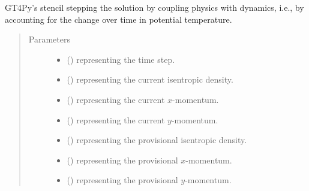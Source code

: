 \documentclass[letterpaper,10pt,english]{sphinxmanual}
\begin{document}
\begin{fulllineitems}
\begin{fulllineitems}
\label{\detokenize{api:dycore.prognostic_isentropic_centered.PrognosticIsentropicCentered._stencil_stepping_by_coupling_physics_with_dynamics_defs}}
GT4Py’s stencil stepping the solution by coupling physics with dynamics, i.e., by accounting for the
change over time in potential temperature.
\begin{quote}\begin{description}
\item[{Parameters}] \leavevmode\begin{itemize}
\item {} 
 () \textendash{}  representing the time step.

\item {} 
 () \textendash{}  representing the current isentropic density.

\item {} 
 () \textendash{}  representing the current \(x\)-momentum.

\item {} 
 () \textendash{}  representing the current \(y\)-momentum.

\item {} 
 () \textendash{}  representing the provisional isentropic density.

\item {} 
 () \textendash{}  representing the provisional \(x\)-momentum.

\item {} 
 () \textendash{}  representing the provisional \(y\)-momentum.


\end{itemize}
\end{description}
\end{quote}
\end{fulllineitems}
\end{fulllineitems}
\end{document}
